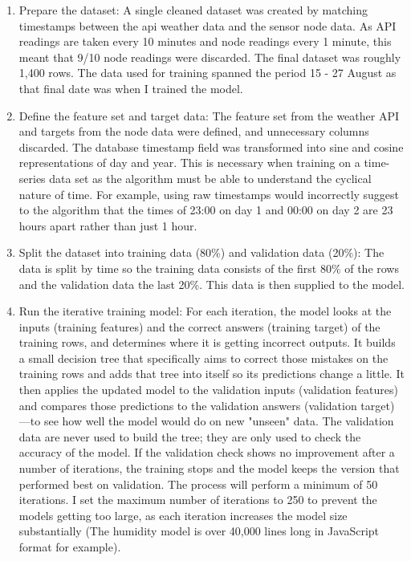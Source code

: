 \begin{enumerate}
    \item Prepare the dataset: A single cleaned dataset was created by matching
          timestamps between the api weather data and the sensor node data. As
          API readings are taken every 10 minutes and node readings every 1
          minute, this meant that 9/10 node readings were discarded. The final
          dataset was roughly 1,400 rows. The data used for training spanned the
          period 15 - 27 August as that final date was when I trained the model.
    \item Define the feature set and target data: The feature set from the
          weather API and targets from the node data were defined, and
          unnecessary columns discarded. The database timestamp field was
          transformed into sine and cosine representations of day and year. This
          is necessary when training on a time-series data set as the algorithm
          must be able to understand the cyclical nature of time. For example,
          using raw timestamps would incorrectly suggest to the algorithm that
          the times of 23:00 on day 1 and 00:00 on day 2 are 23 hours apart
          rather than just 1 hour.
    \item Split the dataset into training data (80\%) and validation data
          (20\%): The data is split by time so the training data consists of the
          first 80\% of the rows and the validation data the last 20\%.  This
          data is then supplied to the model.
    \item Run the iterative training model: For each iteration, the model looks
          at the inputs (training features) and the correct answers (training
          target) of the training rows, and determines where it is getting
          incorrect outputs. It builds a small decision tree that specifically
          aims to correct those mistakes on the training rows and adds that tree
          into itself so its predictions change a little. It then applies the
          updated model to the validation inputs (validation features) and
          compares those predictions to the validation answers (validation
          target) —to see how well the model would do on new "unseen" data. The
          validation data are never used to build the tree; they are only used
          to check the accuracy of the model. If the validation check shows no
          improvement after a number of iterations, the training stops and the
          model keeps the version that performed best on validation.  The
          process will perform a minimum of 50 iterations. I set the maximum
          number of iterations to 250 to prevent the models getting too large,
          as each iteration increases the model size substantially (The humidity
          model is over 40,000 lines long in JavaScript format for example).
\end{enumerate}

